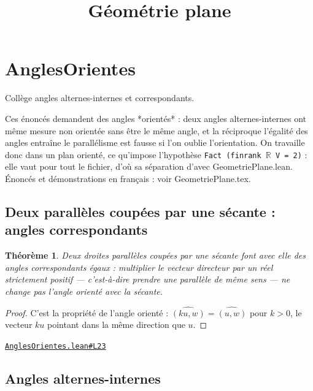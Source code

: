 \documentclass[11pt,a4paper]{article}
\title{Géométrie plane}
\date{}
\theoremstyle{definition}
\theoremstyle{plain}
\newtheorem{theoreme}{Théorème}
\newcommand{\source}[2]{\par\smallskip\noindent\hfill{\footnotesize\href{#1}{\texttt{#2}}}\par\smallskip}
\begin{document}
\maketitle
\sloppy

\section{AnglesOrientes}

\noindent
Collège \textemdash{} angles alternes-internes et correspondants.

Ces énoncés demandent des angles *orientés* : deux angles alternes-internes ont même
mesure non orientée sans être le même angle, et la réciproque \textemdash{} l'égalité des angles
entraîne le parallélisme \textemdash{} est fausse si l'on oublie l'orientation. On travaille donc dans
un plan orienté, ce qu'impose l'hypothèse \texttt{Fact (finrank \(\mathbb{R}\) V = 2)} : elle vaut pour tout
le fichier, d'où sa séparation d'avec GeometriePlane.lean.
Énoncés et démonstrations en français : voir GeometriePlane.tex.

\subsection{Deux parallèles coupées par une sécante : angles correspondants}

\begin{theoreme}
Deux droites parallèles coupées par une sécante font avec elle des \emph{angles
correspondants} égaux : multiplier le vecteur directeur par un réel strictement positif —
c'est-à-dire prendre une parallèle de même sens — ne change pas l'angle orienté avec la
sécante.
\end{theoreme}

\begin{proof}
C'est la propriété de l'angle orienté : $\widehat{(ku, w)} = \widehat{(u, w)}$ pour
$k > 0$, le vecteur $ku$ pointant dans la même direction que $u$.
\end{proof}
\source{https://github.com/Commutator-IO/learn-lean/blob/main/courses/01-college/02-geometrie-plane/AnglesOrientes.lean\#L23}{AnglesOrientes.lean\#L23}

\subsection{Angles alternes-internes}
\end{document}
